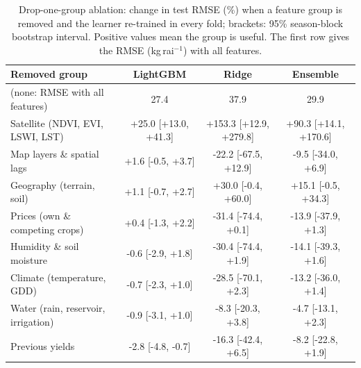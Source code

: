 \begin{table}[H]\centering\scriptsize
\caption{Drop-one-group ablation: change in test RMSE (\%) when a feature group is removed and the learner re-trained in every fold; brackets: 95\% season-block bootstrap interval. Positive values mean the group is useful. The first row gives the RMSE (kg\,rai$^{-1}$) with all features.}\label{tab:ablation}
\begin{tabular}{@{}lccc@{}}
\toprule
Removed group & LightGBM & Ridge & Ensemble \\
\midrule
(none: RMSE with all features) & 27.4 & 37.9 & 29.9 \\
\midrule
Satellite (NDVI, EVI, LSWI, LST) & +25.0 [+13.0, +41.3] & +153.3 [+12.9, +279.8] & +90.3 [+14.1, +170.6] \\
Map layers \& spatial lags & +1.6 [-0.5, +3.7] & -22.2 [-67.5, +12.9] & -9.5 [-34.0, +6.9] \\
Geography (terrain, soil) & +1.1 [-0.7, +2.7] & +30.0 [-0.4, +60.0] & +15.1 [-0.5, +34.3] \\
Prices (own \& competing crops) & +0.4 [-1.3, +2.2] & -31.4 [-74.4, +0.1] & -13.9 [-37.9, +1.3] \\
Humidity \& soil moisture & -0.6 [-2.9, +1.8] & -30.4 [-74.4, +1.9] & -14.1 [-39.3, +1.6] \\
Climate (temperature, GDD) & -0.7 [-2.3, +1.0] & -28.5 [-70.1, +2.3] & -13.2 [-36.0, +1.4] \\
Water (rain, reservoir, irrigation) & -0.9 [-3.1, +1.0] & -8.3 [-20.3, +3.8] & -4.7 [-13.1, +2.3] \\
Previous yields & -2.8 [-4.8, -0.7] & -16.3 [-42.4, +6.5] & -8.2 [-22.8, +1.9] \\
\bottomrule
\end{tabular}
\end{table}
